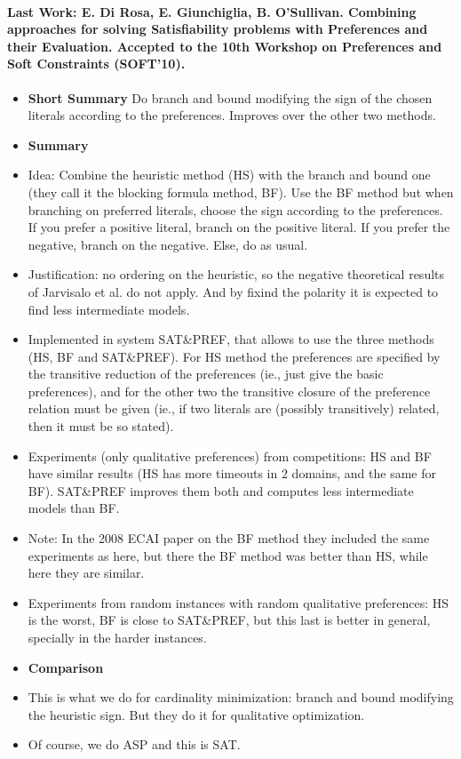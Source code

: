 \paragraph{Last Work: E. Di Rosa, E. Giunchiglia, B. O'Sullivan. 
Combining approaches for solving Satisfiability problems with Preferences and their Evaluation. 
Accepted to the 10th Workshop on Preferences and Soft Constraints (SOFT'10).}
\begin{itemize}
	\item \textbf{Short Summary}
				Do branch and bound modifying the sign of the chosen literals according to the preferences.
				Improves over the other two methods.
	\item \textbf{Summary}
	\item Idea: Combine the heuristic method (HS) with the branch and bound one (they call it the blocking formula method, BF).
				Use the BF method but when branching on preferred literals, choose the sign according to the preferences.
				If you prefer a positive literal, branch on the positive literal. If you prefer the negative, branch on the negative.
				Else, do as usual.
	\item Justification: no ordering on the heuristic, so the negative theoretical results of Jarvisalo et al. do not apply.
				And by fixind the polarity it is expected to find less intermediate models.
	\item Implemented in system SAT\&PREF, that allows to use the three methods (HS, BF and SAT\&PREF).
				For HS method the preferences are specified by the transitive reduction of the preferences (ie., just give the basic preferences), 
				and for the other two the transitive closure of the preference relation must be given (ie., if two literals are (possibly 
				transitively) related, then it must be so stated).
	\item Experiments (only qualitative preferences) from competitions: 
				HS and BF have similar results (HS has more timeouts in 2 domains, and the same for BF).
				SAT\&PREF improves them both and computes less intermediate models than BF.
	\item Note: In the 2008 ECAI paper on the BF method they included the same experiments as here, but there the BF method
				was better than HS, while here they are similar.
	\item Experiments from random instances with random qualitative preferences: HS is the worst, 
				BF is close to SAT\&PREF, but this last is better in general, specially in the harder instances.
	\item \textbf{Comparison}
	\item This is what we do for cardinality minimization: branch and bound modifying the heuristic sign.
				But they do it for qualitative optimization.
	\item Of course, we do ASP and this is SAT.
\end{itemize}

